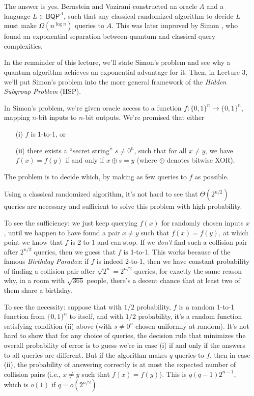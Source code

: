 \documentclass[12pt]{report}
\theoremstyle{plain}
\theoremstyle{definition}
\begin{document}
The answer is yes.  Bernstein and Vazirani \cite{bv} constructed an oracle $A$ and a language $L \in \mathsf{BQP}^A$,
such that any classical randomized algorithm to decide $L$ must make $\Omega(n^{\log n})$ queries to $A$.  This was later
improved by Simon \cite{simon}, who found an exponential separation between quantum and classical query complexities.

In the remainder of this lecture, we'll state Simon's problem and see why a quantum algorithm achieves an exponential
advantage for it. Then, in Lecture 3, we'll put Simon's problem into the more general framework of the {\em Hidden Subgroup Problem}
(HSP).

In Simon's problem, we're given oracle access to a function $f:\{0,1\}^n\longrightarrow \{0,1\}^n$, mapping $n$-bit
inputs to $n$-bit outputs. We're promised that either

\begin{enumerate}
\item[(i)] $f$ is 1-to-1, or
\item[(ii)] there exists a ``secret string'' $s\ne 0^n$, such that for all $x\ne y$, we have $f(x)=f(y)$ if and only if $x\oplus s = y$
(where $\oplus$ denotes bitwise XOR).
\end{enumerate}

\noindent The problem is to decide which, by making as few queries to $f$ as possible.

Using a classical randomized algorithm, it's not hard to see that $\Theta(2^{n/2})$ queries are necessary and sufficient to solve this problem
with high probability.

To see the sufficiency: we just keep querying $f(x)$ for randomly chosen inputs $x$, until we happen to have found a pair $x\ne y$ such that $f(x)=f(y)$, at which
point we know that $f$ is 2-to-1 and can stop. If we {\em don't} find such a collision pair after $2^{n/2}$ queries, then we guess that $f$ is 1-to-1. This works
because of the famous {\em Birthday Paradox}: if $f$ is indeed 2-to-1, then we have constant probability of finding a collision pair after $\sqrt{2^n} = 2^{n/2}$
queries, for exactly the same reason why, in a room with $\sqrt{365}$ people, there's a decent chance that at least two of them share a birthday.

To see the necessity: suppose that with $1/2$ probability, $f$ is a random 1-to-1 function
from $\{0,1\}^n$ to itself, and with $1/2$ probability, it's a random function satisfying condition (ii)
above (with $s\ne 0^n$ chosen uniformly at random).
It's not hard to show that for any choice of queries, the decision rule that minimizes the
overall probability of error is to guess we're in case (i) if and only if the answers to all queries are
different. But if the algorithm makes $q$ queries to $f$, then in case (ii), the probability of answering correctly
is at most the expected number of collision pairs (i.e.,
$x \neq y$ such that $f(x)=f(y)$).  This is $q(q-1)2^{n-1}$, which is $o(1)$ if $q=o(2^{n/2})$.
\end{document}
